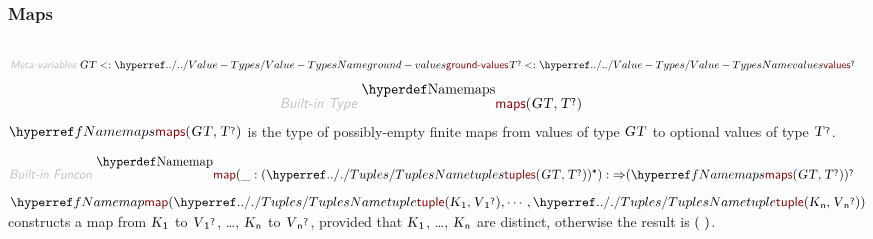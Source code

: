 \subsubsection*{Maps}\hypertarget{maps}{}\label{maps}

\begin{align*}
  [ ~ 
  \KEY{Type} ~ & \NAMEREF{maps} \\
  \KEY{Funcon} ~ & \NAMEREF{map} \\
  \KEY{Funcon} ~ & \NAMEREF{map-elements} \\
  \KEY{Funcon} ~ & \NAMEREF{map-lookup} \\
  \KEY{Alias} ~ & \NAMEREF{lookup} \\
  \KEY{Funcon} ~ & \NAMEREF{map-domain} \\
  \KEY{Alias} ~ & \NAMEREF{dom} \\
  \KEY{Funcon} ~ & \NAMEREF{map-override} \\
  \KEY{Funcon} ~ & \NAMEREF{map-unite} \\
  \KEY{Funcon} ~ & \NAMEREF{map-delete}
  ~ ]
\end{align*}
\begin{align*}
  \KEY{Meta-variables} ~ 
  & \VAR{GT} <: \NAMEHYPER{../..}{Value-Types}{ground-values} \VAR{T}\QUERY <: \NAMEHYPER{../..}{Value-Types}{values}\QUERY
\end{align*}
\begin{align*}
  \KEY{Built-in Type} ~  
  & \NAMEDECL{maps}(\VAR{GT} , \VAR{T}\QUERY ) 
\end{align*}
$\SHADE{\NAMEREF{maps}
           ( \VAR{GT},   
             \VAR{T}\QUERY )}$ is the type of possibly-empty finite maps from values of 
  type $\SHADE{\VAR{GT}}$ to optional values of type $\SHADE{\VAR{T}\QUERY}$.

\begin{align*}
  \KEY{Built-in Funcon} ~ 
  & \NAMEDECL{map}(\_ : ( \NAMEHYPER{../.}{Tuples}{tuples}
                                  ( \VAR{GT},   
                                    \VAR{T}\QUERY ) )\STAR) :  \TO ( \NAMEREF{maps}
                                                                           ( \VAR{GT},   
                                                                             \VAR{T}\QUERY ) )\QUERY
\end{align*}
$\SHADE{\NAMEREF{map}
           ( \NAMEHYPER{../.}{Tuples}{tuple}
               ( \VAR{K}\SUB{1},    
                 \VAR{V}\SUB{1}\QUERY ),   
             \cdots,   
             \NAMEHYPER{../.}{Tuples}{tuple}
               ( \VAR{K}\SUB{n},    
                 \VAR{V}\SUB{n}\QUERY ) )}$ constructs a map from 
  $\SHADE{\VAR{K}\SUB{1}}$ to $\SHADE{\VAR{V}\SUB{1}\QUERY}$, \ldots{}, $\SHADE{\VAR{K}\SUB{n}}$ to $\SHADE{\VAR{V}\SUB{n}\QUERY}$, provided that $\SHADE{\VAR{K}\SUB{1}}$, \ldots{}, $\SHADE{\VAR{K}\SUB{n}}$
  are distinct, otherwise the result is $\strut(  ~  )\strut$.


